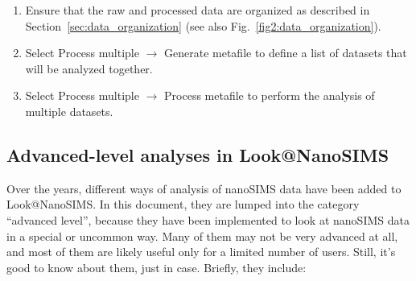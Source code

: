 \documentclass[a4paper, 11pt]{article}
\newcommand{\lans}[1]{{\color{magenta}#1}}
\newcommand\ra{\rightarrow}
\newcommand\addon[1]{-- {\small #1}}
\begin{document}
\begin{enumerate}

\item Ensure that the raw and processed data are organized as described in Section~\ref{sec:data_organization} (see also Fig.~\ref{fig2:data_organization}).

\item Select \lans{Process multiple} $\ra$ \lans{Generate metafile} to define a list of datasets that will be analyzed together.


\item Select \lans{Process multiple} $\ra$ \lans{Process metafile} to perform the analysis of multiple datasets.

\end{enumerate}


\subsection{Advanced-level analyses in Look@NanoSIMS}

Over the years, different ways of analysis of nanoSIMS data have been added to Look@NanoSIMS. In this document, they are lumped into the category ``advanced level'', because they have been implemented to look at nanoSIMS data in a special or uncommon way. Many of them may not be very advanced at all, and most of them are likely useful only for a limited number of users. Still, it's good to know about them, just in case. Briefly, they include:
\end{document}
